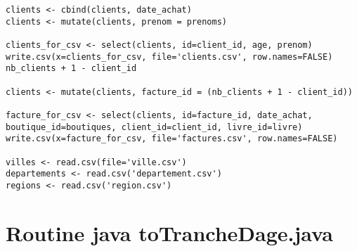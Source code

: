 \begin{lstlisting}
clients <- cbind(clients, date_achat)
clients <- mutate(clients, prenom = prenoms)

clients_for_csv <- select(clients, id=client_id, age, prenom)
write.csv(x=clients_for_csv, file='clients.csv', row.names=FALSE)
nb_clients + 1 - client_id

clients <- mutate(clients, facture_id = (nb_clients + 1 - client_id))

facture_for_csv <- select(clients, id=facture_id, date_achat, boutique_id=boutiques, client_id=client_id, livre_id=livre)
write.csv(x=facture_for_csv, file='factures.csv', row.names=FALSE)

villes <- read.csv(file='ville.csv')
departements <- read.csv('departement.csv')
regions <- read.csv('region.csv')
\end{lstlisting}

\section{Routine java toTrancheDage.java}

\lstset{language=java}
\lstset{frame=shadowbox}

